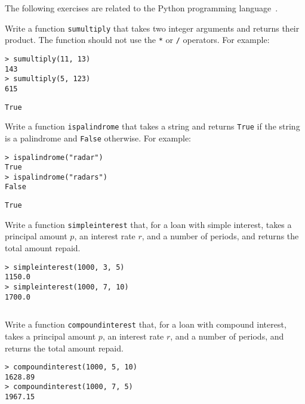 \documentclass[a4paper, 12pt]{exam}
\begin{document}
\noindent
The following exercises are related to the Python programming language~\cite{pythonwebsite}.

\begin{questions}

\question
Write a function \texttt{sumultiply} that takes two integer arguments and returns their product.
The function should not use the \texttt{*} or \texttt{/} operators.
For example:
\begin{verbatim}
> sumultiply(11, 13)
143
> sumultiply(5, 123)
615
\end{verbatim}

\begin{solution}
  \begin{verbatim}
True
  \end{verbatim}
\end{solution}


\question
Write a function \texttt{ispalindrome} that takes a string and returns \texttt{True} if the string is a palindrome and \texttt{False} otherwise.
For example:
\begin{verbatim}
> ispalindrome("radar")
True
> ispalindrome("radars")
False
\end{verbatim}

\begin{solution}
  \begin{verbatim}
True
  \end{verbatim}
\end{solution}


\question
Write a function \texttt{simpleinterest} that, for a loan with simple interest, takes a principal amount $p$, an interest rate $r$, and a number of periods, and returns the total amount repaid. 
\begin{verbatim}
> simpleinterest(1000, 3, 5)
1150.0
> simpleinterest(1000, 7, 10)
1700.0
\end{verbatim}

\begin{solution}
  \inputminted{python}{solutions/simpleinterest.py}
\end{solution}


\question
Write a function \texttt{compoundinterest} that, for a loan with compound interest, takes a principal amount $p$, an interest rate $r$, and a number of periods, and returns the total amount repaid. 
\begin{verbatim}
> compoundinterest(1000, 5, 10)
1628.89
> compoundinterest(1000, 7, 5)
1967.15
\end{verbatim}


\end{questions}
\end{document}
